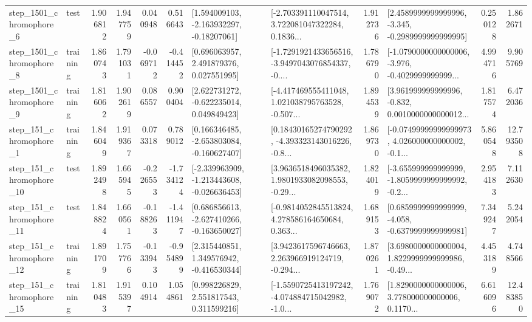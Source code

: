 \begin{tabular}{llrrrrllrlrr}
  step\_1501\_chromophore\_6 &      test &      1.906812 &    1.947759 &      0.040948 &  0.516643 &    [1.594009103, -2.163932297, -0.18207061] &  [-2.703391110047514, 3.722081047322284, 0.1836... &       1.912736 &  [2.4589999999999996, -3.345, -0.2989999999999995] &            0.250128 &          1.862671 \\
  step\_1501\_chromophore\_8 &  training &      1.860743 &    1.791031 &     -0.069712 & -0.414452 &     [0.696063957, 2.491879376, 0.027551995] &  [-1.7291921433656516, -3.9497043076854337, -0.... &       1.786790 &  [-1.0790000000000006, -3.976, -0.4029999999999... &            4.994716 &          9.905769 \\
  step\_1501\_chromophore\_9 &  training &      1.816062 &    1.902619 &      0.086557 &  0.900404 &    [2.622731272, -0.622235014, 0.049849423] &  [-4.417469555411048, 1.021038795763528, -0.507... &       1.894539 &  [3.961999999999996, -0.832, 0.0010000000000012... &            1.817574 &          6.472036 \\
   step\_151\_chromophore\_1 &  training &      1.846049 &    1.919367 &      0.073318 &  0.789012 &   [0.166346485, -2.653803084, -0.160627407] &  [0.18430165274790292, -4.393323143016226, -0.8... &       1.869730 &  [-0.07499999999999973, 4.026000000000002, -0.1... &            5.860548 &         12.793508 \\
  step\_151\_chromophore\_10 &      test &      1.892498 &    1.665945 &     -0.226553 & -1.734124 &  [-2.339963909, -1.213443608, -0.026636453] &  [3.9636518496035382, 1.9801933082098553, -0.29... &       1.824019 &  [-3.655999999999999, -1.8059999999999992, -0.2... &            2.954183 &          7.112630 \\
  step\_151\_chromophore\_11 &      test &      1.848824 &    1.660561 &     -0.188263 & -1.411947 &   [0.686856613, -2.627410266, -0.163650027] &  [-0.9814052845513824, 4.278586164650684, 0.363... &       1.689153 &  [0.6859999999999999, -4.058, -0.6379999999999981] &            7.349247 &          5.242054 \\
  step\_151\_chromophore\_12 &  training &      1.891709 &    1.757766 &     -0.133943 & -0.954899 &    [2.315440851, 1.349576942, -0.416530344] &  [3.9423617596746663, 2.263966919124719, -0.294... &       1.870261 &  [3.6980000000000004, 1.8229999999999986, -0.49... &            4.453189 &          4.748566 \\
  step\_151\_chromophore\_15 &  training &      1.810483 &    1.915397 &      0.104914 &  1.054861 &     [0.998226829, 2.551817543, 0.311599216] &  [-1.5590725413197242, -4.074884715042982, -1.0... &       1.769072 &  [1.8290000000000006, 3.778000000000006, 0.1170... &            6.616096 &         12.483850 \\

\end{tabular}
